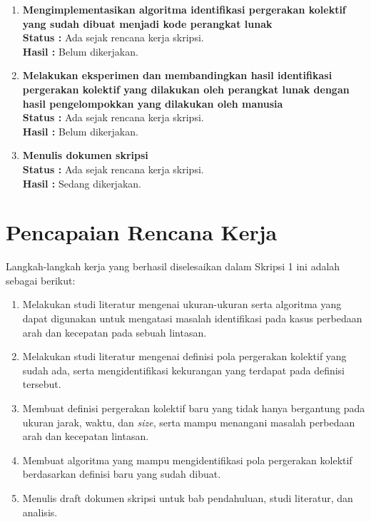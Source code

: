 \documentclass[a4paper,twoside]{article}
\begin{document}
\begin{enumerate}
		\item \textbf{Mengimplementasikan algoritma identifikasi pergerakan kolektif yang sudah dibuat menjadi kode perangkat lunak} \\
		{\bf Status :} Ada sejak rencana kerja skripsi.\\
		{\bf Hasil :} Belum dikerjakan. \\

		\item \textbf{Melakukan eksperimen dan membandingkan hasil identifikasi pergerakan kolektif yang dilakukan oleh perangkat lunak dengan hasil pengelompokkan yang dilakukan oleh manusia}\\
		{\bf Status :} Ada sejak rencana kerja skripsi.\\
		{\bf Hasil :} Belum dikerjakan. \\

		\item \textbf{Menulis dokumen skripsi}\\
		{\bf Status :} Ada sejak rencana kerja skripsi.\\
		{\bf Hasil :} Sedang dikerjakan.
	\end{enumerate}

\section{Pencapaian Rencana Kerja}

Langkah-langkah kerja yang berhasil diselesaikan dalam Skripsi 1 ini adalah sebagai berikut:

\begin{enumerate}
    \item Melakukan studi literatur mengenai ukuran-ukuran serta algoritma yang dapat digunakan untuk mengatasi masalah identifikasi pada kasus perbedaan arah dan kecepatan pada sebuah lintasan.
    \item Melakukan studi literatur mengenai definisi pola pergerakan kolektif yang sudah ada, serta mengidentifikasi kekurangan yang terdapat pada definisi tersebut.
    \item Membuat definisi pergerakan kolektif baru yang tidak hanya bergantung pada ukuran jarak, waktu, dan \textit{size}, serta mampu menangani masalah perbedaan arah dan kecepatan lintasan.
    \item Membuat algoritma yang mampu mengidentifikasi pola pergerakan kolektif berdasarkan definisi baru yang sudah dibuat.
    \item Menulis draft dokumen skripsi untuk bab pendahuluan, studi literatur, dan analisis.
\end{enumerate}
\end{document}

